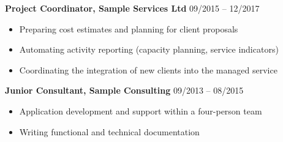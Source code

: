 \begin{cvparagraph}

{\large \textbf{Project Coordinator, Sample Services Ltd}} \hfill 09/2015 -- 12/2017

\vspace{1mm}

\begin{itemize}
\setlength{\itemsep}{0pt}
\setlength{\parskip}{0pt}
    \item Preparing cost estimates and planning for client proposals
    \item Automating activity reporting (capacity planning, service indicators)
    \item Coordinating the integration of new clients into the managed service
\end{itemize}

\vspace{1mm}

{\large \textbf{Junior Consultant, Sample Consulting}} \hfill 09/2013 -- 08/2015

\vspace{1mm}

\begin{itemize}
\setlength{\itemsep}{0pt}
\setlength{\parskip}{0pt}
    \item Application development and support within a four-person team
    \item Writing functional and technical documentation
\end{itemize}

\vspace{1mm}

\end{cvparagraph}
